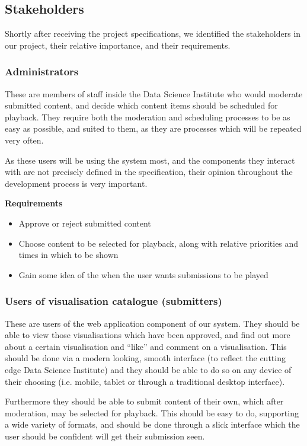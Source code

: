 \documentclass[a4paper, titlepage]{article}
\begin{document}
\subsection{Stakeholders}

Shortly after receiving the project specifications, we identified the stakeholders in our project, their relative importance, and their requirements.

\subsubsection{Administrators}
These are members of staff inside the Data Science Institute who would moderate submitted content, and decide which content items should be scheduled for playback. They require both the moderation and scheduling processes to be as easy as possible, and suited to them, as they are processes which will be repeated very often.

As these users will be using the system most, and the components they interact with are not precisely defined in the specification, their opinion throughout the development process is very important.

\textbf{Requirements}
\begin{itemize}
\itemsep-1mm
\item Approve or reject submitted content
\item Choose content to be selected for playback, along with relative priorities and times in which to be shown
\item Gain some idea of the when the user wants submissions to be played
\end{itemize}



\subsubsection{Users of visualisation catalogue (submitters)}

These are users of the web application component of our system. They should be able to view those visualisations which have been approved, and find out more about a certain visualisation and ``like'' and comment on a visualisation. This should be done via a modern looking, smooth interface (to reflect the cutting edge Data Science Institute) and they should be able to do so on any device of their choosing (i.e. mobile, tablet or through a traditional desktop interface).

Furthermore they should be able to submit content of their own, which after moderation, may be selected for playback. This should be easy to do, supporting a wide variety of formats, and should be done through a slick interface which the user should be confident will get their submission seen.
\end{document}
